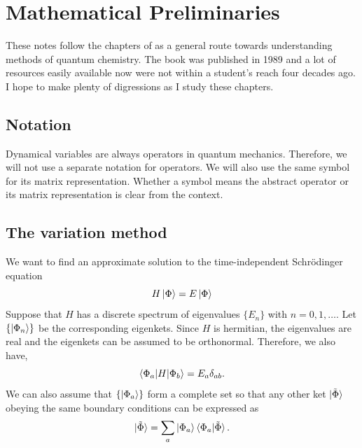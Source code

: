\chapter{Mathematical Preliminaries}\label{c1}
These notes follow the chapters of \cite{so1989} as a general route towards 
understanding methods of quantum chemistry. The book was published in 1989 and
a lot of resources easily available now were not within a student's reach four
decades ago. I hope to make plenty of digressions as I study these chapters.

\section{Notation}
Dynamical variables are always operators in quantum mechanics. Therefore, we will
not use a separate notation for operators. We will also use the same symbol for
its matrix representation. Whether a symbol means the abstract operator or its
matrix representation is clear from the context.

\section{The variation method}
We want to find an approximate solution to the time-independent Schr\"{o}dinger
equation
\begin{equation}\label{c1e1}
H\ket{\Phi} = E\ket{\Phi}
\end{equation}
Suppose that $H$ has a discrete spectrum of eigenvalues $\{E_n\}$
with $n = 0, 1, \ldots$. Let $\{\ket{\Phi_n}\}$ be the corresponding eigenkets.
Since $H$ is hermitian, the eigenvalues are real and the eigenkets can be
assumed to be orthonormal. Therefore, we also have,
\begin{equation}\label{c1e2}
\braket{\Phi_a|H|\Phi_b} = E_a\delta_{ab}.
\end{equation}
We can also assume that $\{\ket{\Phi_a}\}$ form a complete set so that any other
ket $\ket{\tilde{\Phi}}$ obeying the same boundary conditions can be expressed
as 
\begin{equation}\label{c1e3}
\ket{\tilde{\Phi}} = \sum_a\ket{\Phi_a}\braket{\Phi_a|\tilde{\Phi}}.
\end{equation}

